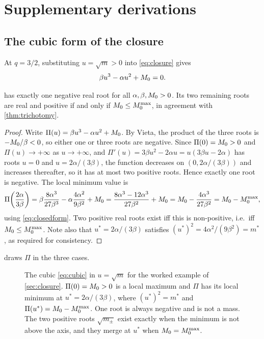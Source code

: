 \section{Supplementary derivations}
\label{app:proofs}

\subsection{The cubic form of the closure}

At $q=3/2$, substituting $u=\sqrt m>0$ into \cref{eq:closure} gives
\begin{equation}
  \beta u^3 - \alpha u^2 + M_0 = 0 .
  \label{eq:cubic}
\end{equation}

\begin{proposition}
 has exactly one negative real root for all
$\alpha,\beta,M_0>0$. Its two remaining roots are real and positive if and
only if $M_0\le M_0^{\max}$, in agreement with \cref{thm:trichotomy}.
\end{proposition}

\begin{proof}
Write $\Pi(u) = \beta u^3-\alpha u^2+M_0$. By Vieta, the product of the
three roots is $-M_0/\beta<0$, so either one or three roots are negative.
Since $\Pi(0)=M_0>0$ and $\Pi(u)\to+\infty$ as $u\to+\infty$, and
$\Pi'(u)=3\beta u^2-2\alpha u = u(3\beta u - 2\alpha)$ has roots $u=0$ and
$u=2\alpha/(3\beta)$, the function decreases on $(0,2\alpha/(3\beta))$ and
increases thereafter, so it has at most two positive roots. Hence exactly one
root is negative. The local minimum value is
\[
  \Pi\!\left(\frac{2\alpha}{3\beta}\right)
  = \beta\frac{8\alpha^3}{27\beta^3} - \alpha\frac{4\alpha^2}{9\beta^2} + M_0
  = \frac{8\alpha^3-12\alpha^3}{27\beta^2} + M_0
  = M_0 - \frac{4\alpha^3}{27\beta^2}
  = M_0 - M_0^{\max} ,
\]
using \cref{eq:closedform}. Two positive real roots exist iff this is
non-positive, i.e.\ iff $M_0\le M_0^{\max}$. Note also that
$u^* = 2\alpha/(3\beta)$ satisfies $(u^*)^2 = 4\alpha^2/(9\beta^2) = m^*$, as
required for consistency.
\end{proof}

 draws $\Pi$ in the three cases.

\begin{figure}[tbp]
\centering

\caption{The cubic \cref{eq:cubic} in $u=\sqrt m$ for the worked example of
\cref{sec:closure}. $\Pi(0)=M_0>0$ is a local maximum and $\Pi$ has its
local minimum at $u^*=2\alpha/(3\beta)$, where $(u^*)^2=m^*$ and
$\Pi(u^*)=M_0-M_0^{\max}$. One root is always negative and is not a mass. The
two positive roots $\sqrt{m_\pm}$ exist exactly when the minimum is not above
the axis, and they merge at $u^*$ when $M_0=M_0^{\max}$.}
\label{fig:cubic}
\end{figure}

